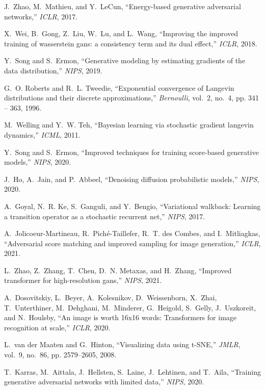 \documentclass[lettersize,journal]{IEEEtran}
\begin{document}
\begin{thebibliography}{10}
J.~Zhao, M.~Mathieu, and Y.~LeCun, ``Energy-based generative adversarial
  networks,'' \emph{ICLR}, 2017.

X.~Wei, B.~Gong, Z.~Liu, W.~Lu, and L.~Wang, ``Improving the improved training
  of wasserstein gans: a consistency term and its dual effect,'' \emph{ICLR},
  2018.

Y.~Song and S.~Ermon, ``Generative modeling by estimating gradients of the data
  distribution,'' \emph{NIPS}, 2019.

G.~O. Roberts and R.~L. Tweedie, ``{Exponential convergence of Langevin
  distributions and their discrete approximations},'' \emph{Bernoulli}, vol.~2,
  no.~4, pp. 341 -- 363, 1996.

M.~Welling and Y.~W. Teh, ``Bayesian learning via stochastic gradient langevin
  dynamics,'' \emph{ICML}, 2011.

Y.~Song and S.~Ermon, ``Improved techniques for training score-based generative
  models,'' \emph{NIPS}, 2020.

J.~Ho, A.~Jain, and P.~Abbeel, ``Denoising diffusion probabilistic models,''
  \emph{NIPS}, 2020.

A.~Goyal, N.~R. Ke, S.~Ganguli, and Y.~Bengio, ``Variational walkback: Learning
  a transition operator as a stochastic recurrent net,'' \emph{NIPS}, 2017.

A.~Jolicoeur{-}Martineau, R.~Pich{\'{e}}{-}Taillefer, R.~T. {des Combes}, and
  I.~Mitliagkas, ``Adversarial score matching and improved sampling for image
  generation,'' \emph{ICLR}, 2021.

L.~Zhao, Z.~Zhang, T.~Chen, D.~N. Metaxas, and H.~Zhang, ``Improved transformer
  for high-resolution gans,'' \emph{NIPS}, 2021.

A.~Dosovitskiy, L.~Beyer, A.~Kolesnikov, D.~Weissenborn, X.~Zhai,
  T.~Unterthiner, M.~Dehghani, M.~Minderer, G.~Heigold, S.~Gelly, J.~Uszkoreit,
  and N.~Houlsby, ``An image is worth 16x16 words: Transformers for image
  recognition at scale,'' \emph{ICLR}, 2020.

L.~{van der Maaten} and G.~Hinton, ``Visualizing data using {t-SNE},''
  \emph{JMLR}, vol.~9, no.~86, pp. 2579--2605, 2008.

T.~Karras, M.~Aittala, J.~Hellsten, S.~Laine, J.~Lehtinen, and T.~Aila,
  ``Training generative adversarial networks with limited data,'' \emph{NIPS},
  2020.


\end{thebibliography}
\end{document}
